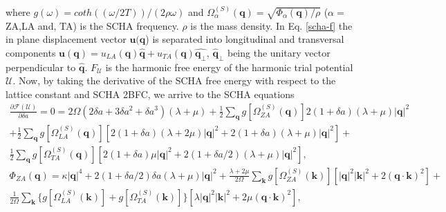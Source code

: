 where $g(\omega)=coth((\omega/2T))/(2\rho\omega)$ and $\Omega_{\alpha}^{(S)}(\boldsymbol{q})=\sqrt{\Phi_{\alpha}(\boldsymbol{q})/\rho}$ ($\alpha=$ZA,LA and, TA) is the SCHA frequency. $\rho$ is the mass density. In 
Eq. \ref{scha-f} the in plane displacement vector $\boldsymbol{u}(\boldsymbol{q}$) is separated into longitudinal 
and transversal components $\boldsymbol{u}(\boldsymbol{q})=u_{LA}(\boldsymbol{q})\hat{\boldsymbol{q}}+u_{TA}(\boldsymbol{q})\hat{\boldsymbol{q}_{\perp}}$, $\hat{\boldsymbol{q}}_{\perp}$ being the unitary vector perpendicular to 
$\hat{\boldsymbol{q}}$. $F_{\mathcal{U}}$ is the harmonic free energy of the harmonic trial potential $\mathcal{U}$. 
Now, by taking the derivative of the SCHA free energy with respect to the lattice constant and SCHA 2BFC, we arrive 
to the SCHA equations
\begin{multline}
 \frac{\partial\mathcal{F}(\mathcal{U})}{\partial\delta a}=0=2\Omega(2\delta a+3\delta a^{2}+\delta a^{3})(\lambda+
\mu)+\frac{1}{2}\sum_{\boldsymbol{q}}g[\Omega_{ZA}^{(S)}(\boldsymbol{q})]2(1+\delta a)(\lambda+\mu)|\boldsymbol{
 q}|^{2}\\+\frac{1}{2}\sum_{\boldsymbol{q}}g[\Omega_{LA}^{(S)}(\boldsymbol{q})][2(1+\delta a)(\lambda+2\mu)|\boldsymbol{q}|^{2}+2(1+\delta a)(\lambda+\mu)|\boldsymbol{q}|^{2}]+\\\frac{1}{2}\sum_{\boldsymbol{q}}g[\Omega_{
 TA}^{(S)}(\boldsymbol{q})][2(1+\delta a)\mu|\boldsymbol{q}|^{2}+2(1+\delta a/2)(\lambda+\mu)|\boldsymbol{q}|^{2}],
\end{multline}
\begin{multline}
 \Phi_{ZA}(\boldsymbol{q})=\kappa|\boldsymbol{q}|^{4}+2(1+\delta a/2)\delta a(\lambda+\mu)|\boldsymbol{q}|^{2}+\frac{\lambda+2\mu}{2\Omega}\sum_{\boldsymbol{k}}g[\Omega_{ZA}^{(S)}(\boldsymbol{k})][|\boldsymbol{q}|^{2}|\boldsymbol{
 k}|^{2}+2(\boldsymbol{q}\cdot\boldsymbol{k})^{2}]+\\\frac{1}{2\Omega}\sum_{\boldsymbol{k}}\{g[\Omega_{LA}^{(S)}(\boldsymbol{k})]+g[\Omega_{TA}^{(S)}(\boldsymbol{k})]\}[\lambda|\boldsymbol{q}|^{2}|\boldsymbol{k}|^{2}+2\mu(
 \boldsymbol{q}\cdot\boldsymbol{k})^{2}],
\end{multline}
